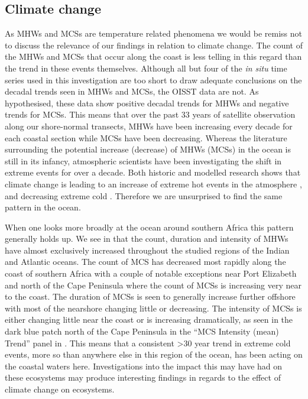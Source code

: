 \documentclass[a4paper,10pt,review]{elsarticle}
\begin{document}
\subsection{Climate change} 
As MHWs and MCSs are temperature related phenomena we would be remiss not to discuss the relevance of our findings in relation to climate change. The count of the MHWs and MCSs that occur along the coast is less telling in this regard than the trend in these events themselves. Although all but four of the \emph{in situ} time series used in this investigation are too short to draw adequate conclusions on the decadal trends seen in MHWs and MCSs, the OISST data are not. As hypothesised, these data show positive decadal trends for MHWs and negative trends for MCSs. This means that over the past 33 years of satellite observation along our shore-normal transects, MHWs have been increasing every decade for each coastal section while MCSs have been decreasing. Whereas the literature surrounding the potential increase (decrease) of MHWs (MCSs) in the ocean is still in its infancy, atmospheric scientists have been investigating the shift in extreme events for over a decade. Both historic and modelled research shows that climate change is leading to an increase of extreme hot events in the atmosphere \citep{Easterling2000, Perkins2013}, and decreasing extreme cold \citep{Meehl2004}. Therefore we are unsurprised to find the same pattern in the ocean.

When one looks more broadly at the ocean around southern Africa this pattern generally holds up. We see in  that the count, duration and intensity of MHWs have almost exclusively increased throughout the studied regions of the Indian and Atlantic oceans. The count of MCS has decreased most rapidly along the coast of southern Africa with a couple of notable exceptions near Port Elizabeth and north of the Cape Peninsula where the count of MCSs is increasing very near to the coast. The duration of MCSs is seen to generally increase further offshore with most of the nearshore changing little or decreasing. The intensity of MCSs is either changing little near the coast or is increasing dramatically, as seen in the dark blue patch north of the Cape Peninsula in the ``MCS Intensity (mean) Trend'' panel in . This means that a consistent >30 year trend in extreme cold events, more so than anywhere else in this region of the ocean, has been acting on the coastal waters here. Investigations into the impact this may have had on these ecosystems may produce interesting findings in regards to the effect of climate change on ecosystems.
\end{document}
